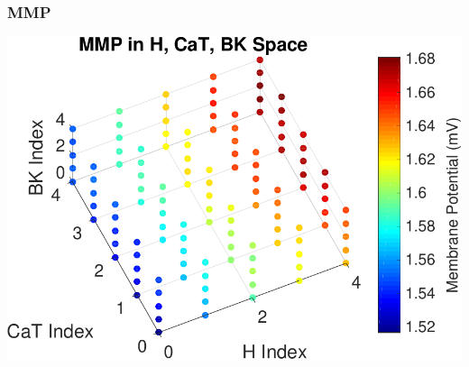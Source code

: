 \documentclass{beamer}
\theoremstyle{plain}
\theoremstyle{definition}
\begin{document}
\begin{frame}\frametitle{MMP}
  \begin{center}
    \includegraphics[scale=.7]{MMPScatter.pdf}%
  \end{center}
\end{frame}
\end{document}
